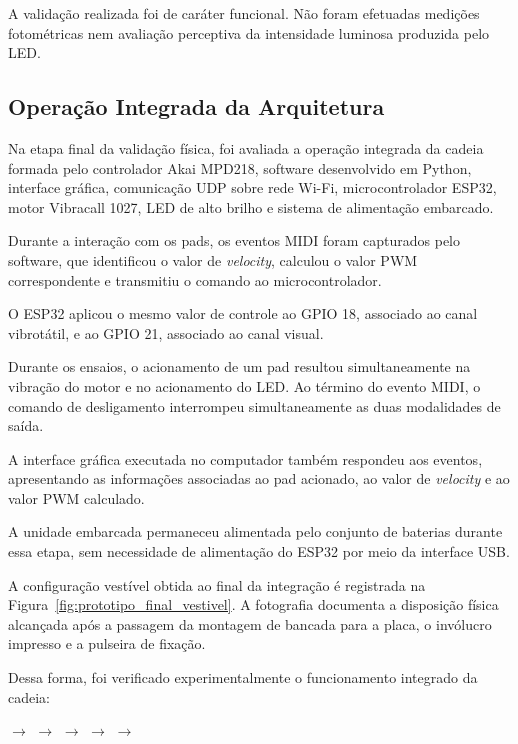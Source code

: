 A validação realizada foi de caráter funcional. Não foram efetuadas medições fotométricas nem avaliação perceptiva da intensidade luminosa produzida pelo LED.


\subsection{Operação Integrada da Arquitetura}

Na etapa final da validação física, foi avaliada a operação integrada da cadeia formada pelo controlador Akai MPD218, software desenvolvido em Python, interface gráfica, comunicação UDP sobre rede Wi-Fi, microcontrolador ESP32, motor Vibracall 1027, LED de alto brilho e sistema de alimentação embarcado.

Durante a interação com os pads, os eventos MIDI foram capturados pelo software, que identificou o valor de \textit{velocity}, calculou o valor PWM correspondente e transmitiu o comando ao microcontrolador.

O ESP32 aplicou o mesmo valor de controle ao GPIO 18, associado ao canal vibrotátil, e ao GPIO 21, associado ao canal visual.

Durante os ensaios, o acionamento de um pad resultou simultaneamente na vibração do motor e no acionamento do LED. Ao término do evento MIDI, o comando de desligamento interrompeu simultaneamente as duas modalidades de saída.

A interface gráfica executada no computador também respondeu aos eventos, apresentando as informações associadas ao pad acionado, ao valor de \textit{velocity} e ao valor PWM calculado.

A unidade embarcada permaneceu alimentada pelo conjunto de baterias durante essa etapa, sem necessidade de alimentação do ESP32 por meio da interface USB.

A configuração vestível obtida ao final da integração é registrada na Figura~\ref{fig:prototipo_final_vestivel}. A fotografia documenta a disposição física alcançada após a passagem da montagem de bancada para a placa, o invólucro impresso e a pulseira de fixação.

Dessa forma, foi verificado experimentalmente o funcionamento integrado da cadeia:

\begin{center}
$\rightarrow$
$\rightarrow$
$\rightarrow$
$\rightarrow$
$\rightarrow$
\end{center}

